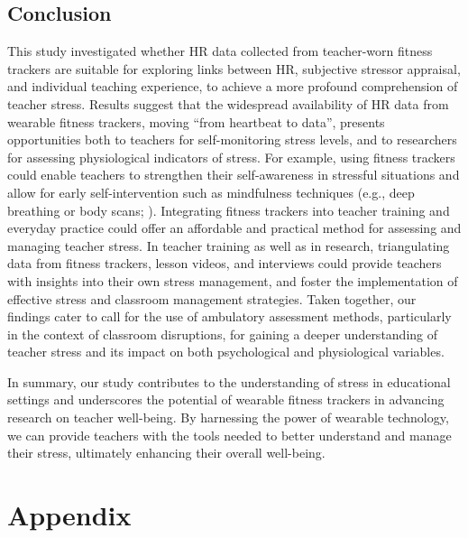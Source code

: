 \documentclass[preprint,
3p]{elsarticle} %
\begin{document}
\subsection{Conclusion}\label{conclusion}

This study investigated whether HR data collected from teacher-worn
fitness trackers are suitable for exploring links between HR, subjective
stressor appraisal, and individual teaching experience, to achieve a
more profound comprehension of teacher stress. Results suggest that the
widespread availability of HR data from wearable fitness trackers,
moving ``from heartbeat to data'', presents opportunities both to
teachers for self-monitoring stress levels, and to researchers for
assessing physiological indicators of stress. For example, using fitness
trackers could enable teachers to strengthen their self-awareness in
stressful situations and allow for early self-intervention such as
mindfulness techniques (e.g., deep breathing or body scans;
\citet{agyapong2023interventions}). Integrating fitness trackers into
teacher training and everyday practice could offer an affordable and
practical method for assessing and managing teacher stress. In teacher
training as well as in research, triangulating data from fitness
trackers, lesson videos, and interviews could provide teachers with
insights into their own stress management, and foster the implementation
of effective stress and classroom management strategies. Taken together,
our findings cater to \citet{wettstein2021} call for the use of
ambulatory assessment methods, particularly in the context of classroom
disruptions, for gaining a deeper understanding of teacher stress and
its impact on both psychological and physiological variables.

In summary, our study contributes to the understanding of stress in
educational settings and underscores the potential of wearable fitness
trackers in advancing research on teacher well-being. By harnessing the
power of wearable technology, we can provide teachers with the tools
needed to better understand and manage their stress, ultimately
enhancing their overall well-being.

\newpage

\appendix
\section*{Appendix}

\setcounter{figure}{0}  %

\setcounter{table}{0}
\end{document}
